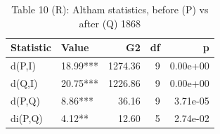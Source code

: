 \begin{table}

\caption{Table 10 (R): Altham statistics, before (P) vs after (Q) 1868}
\centering
\begin{tabular}[t]{llrrr}
\toprule
Statistic & Value & G2 & df & p\\
\midrule
d(P,I) & 18.99*** & 1274.36 & 9 & 0.00e+00\\
d(Q,I) & 20.75*** & 1226.86 & 9 & 0.00e+00\\
d(P,Q) & 8.86*** & 36.16 & 9 & 3.71e-05\\
di(P,Q) & 4.12** & 12.60 & 5 & 2.74e-02\\
\bottomrule
\end{tabular}
\end{table}
